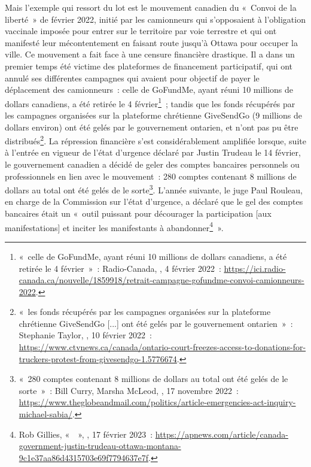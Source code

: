Mais l'exemple qui ressort du lot est le mouvement canadien du «~Convoi de la liberté~» de février 2022, initié par les camionneurs qui s'opposaient à l'obligation vaccinale imposée pour entrer sur le territoire par voie terrestre et qui ont manifesté leur mécontentement en faisant route jusqu'à Ottawa pour occuper la ville. Ce mouvement a fait face à une censure financière drastique. Il a dans un premier temps été victime des plateformes de financement participatif, qui ont annulé ses différentes campagnes qui avaient pour objectif de payer le déplacement des camionneurs~: celle de GoFundMe, ayant réuni 10 millions de dollars canadiens, a été retirée le 4 février\footnote{«~celle de GoFundMe, ayant réuni 10 millions de dollars canadiens, a été retirée le 4 février~»~: Radio-Canada, , 4 février 2022~: \url{https://ici.radio-canada.ca/nouvelle/1859918/retrait-campagne-gofundme-convoi-camionneurs-2022}.}~; tandis que les fonds récupérés par les campagnes organisées sur la plateforme chrétienne GiveSendGo (9 millions de dollars environ) ont été gelés par le gouvernement ontarien, et n'ont pas pu être distribués\footnote{«~les fonds récupérés par les campagnes organisées sur la plateforme chrétienne GiveSendGo [...] ont été gelés par le gouvernement ontarien~»~: Stephanie Taylor, , 10 février 2022~: \url{https://www.ctvnews.ca/canada/ontario-court-freezes-access-to-donations-for-truckers-protest-from-givesendgo-1.5776674}.}. La répression financière s'est considérablement amplifiée lorsque, suite à l'entrée en vigueur de l'état d'urgence déclaré par Justin Trudeau le 14 février, le gouvernement canadien a décidé de geler des comptes bancaires personnels ou professionnels en lien avec le mouvement~: 280 comptes contenant 8 millions de dollars au total ont été gelés de le sorte\footnote{«~280 comptes contenant 8 millions de dollars au total ont été gelés de le sorte~»~: Bill Curry, Marsha McLeod, , 17 novembre 2022~: \url{https://www.theglobeandmail.com/politics/article-emergencies-act-inquiry-michael-sabia/}.}. L'année suivante, le juge Paul Rouleau, en charge de la Commission sur l'état d'urgence, a déclaré que le gel des comptes bancaires était un «~outil puissant pour décourager la participation [aux manifestations] et inciter les manifestants à abandonner\footnote{Rob Gillies, «~~», , 17 février 2023~: \url{https://apnews.com/article/canada-government-justin-trudeau-ottawa-montana-9c1e37aa86d4315703e69f7794637e7f}.}~». %


